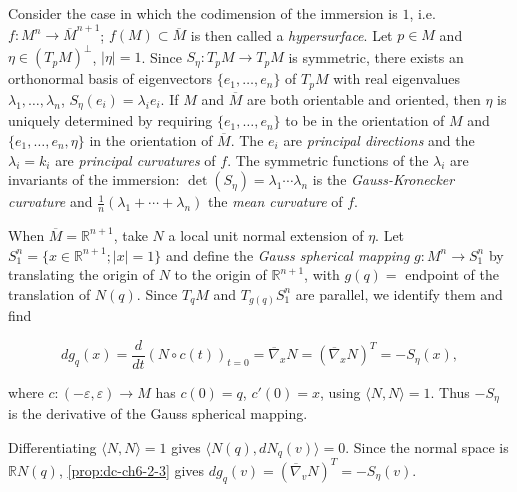 \begin{example}
  \label{ex:dc-ch6-2-4}
  \leanok
  \sketch
  Consider the case in which the codimension of the immersion is $1$, i.e.
  $f:M^n\to\overline{M}^{n+1}$; $f(M)\subset\overline{M}$ is then called a
  \emph{hypersurface}. Let $p\in M$ and $\eta\in(T_pM)^\perp$, $|\eta|=1$. Since
  $S_\eta:T_pM\to T_pM$ is symmetric, there exists an orthonormal basis of
  eigenvectors $\{e_1,\dots,e_n\}$ of $T_pM$ with real eigenvalues
  $\lambda_1,\dots,\lambda_n$, $S_\eta(e_i)=\lambda_i e_i$. If $M$ and $\overline{M}$
  are both orientable and oriented, then $\eta$ is uniquely determined by requiring
  $\{e_1,\dots,e_n\}$ to be in the orientation of $M$ and $\{e_1,\dots,e_n,\eta\}$ in
  the orientation of $\overline{M}$. The $e_i$ are \emph{principal directions} and the
  $\lambda_i=k_i$ are \emph{principal curvatures} of $f$. The symmetric functions of the
  $\lambda_i$ are invariants of the immersion: $\det(S_\eta)=\lambda_1\cdots\lambda_n$
  is the \emph{Gauss-Kronecker curvature} and
  $\frac{1}{n}(\lambda_1+\cdots+\lambda_n)$ the \emph{mean curvature} of $f$.
  
  When $\overline{M}=\mathbb{R}^{n+1}$, take $N$ a local unit normal extension of
  $\eta$. Let $S_1^n=\{x\in\mathbb{R}^{n+1};|x|=1\}$ and define the \emph{Gauss spherical
  mapping} $g:M^n\to S_1^n$ by translating the origin of $N$ to the origin of
  $\mathbb{R}^{n+1}$, with $g(q)=$ endpoint of the translation of $N(q)$. Since
  $T_qM$ and $T_{g(q)}S_1^n$ are parallel, we identify them and find
  
  $$
  dg_q(x)=\frac{d}{dt}(N\circ c(t))_{t=0}=\overline{\nabla}_x N=(\overline{\nabla}_x N)^T=-S_\eta(x),
  $$
  
  where $c:(-\varepsilon,\varepsilon)\to M$ has $c(0)=q$, $c'(0)=x$, using
  $\langle N,N\rangle=1$. Thus $-S_\eta$ is the derivative of the Gauss spherical
  mapping.

  Differentiating $\langle N,N\rangle=1$ gives $\langle N(q),dN_q(v)\rangle=0$. Since the normal space is $\mathbb R N(q)$, \cref{prop:dc-ch6-2-3} gives $dg_q(v)=(\overline\nabla_vN)^T=-S_\eta(v)$.
\end{example}

